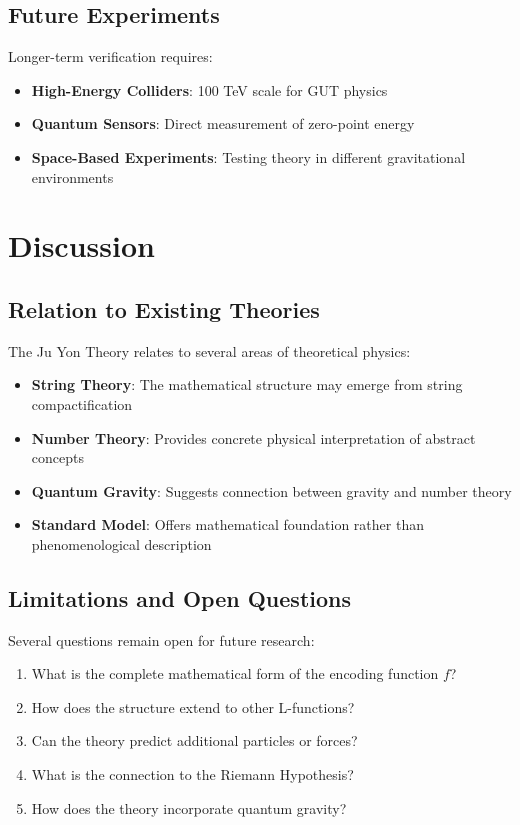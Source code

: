 \documentclass[12pt, a4paper]{article}
\begin{document}
\subsection{Future Experiments}

Longer-term verification requires:

\begin{itemize}
\item \textbf{High-Energy Colliders}: 100 TeV scale for GUT physics
\item \textbf{Quantum Sensors}: Direct measurement of zero-point energy
\item \textbf{Space-Based Experiments}: Testing theory in different gravitational environments
\end{itemize}

\section{Discussion}

\subsection{Relation to Existing Theories}

The Ju Yon Theory relates to several areas of theoretical physics:

\begin{itemize}
\item \textbf{String Theory}: The mathematical structure may emerge from string compactification
\item \textbf{Number Theory}: Provides concrete physical interpretation of abstract concepts
\item \textbf{Quantum Gravity}: Suggests connection between gravity and number theory
\item \textbf{Standard Model}: Offers mathematical foundation rather than phenomenological description
\end{itemize}

\subsection{Limitations and Open Questions}

Several questions remain open for future research:

\begin{enumerate}
\item What is the complete mathematical form of the encoding function $f$?
\item How does the structure extend to other L-functions?
\item Can the theory predict additional particles or forces?
\item What is the connection to the Riemann Hypothesis?
\item How does the theory incorporate quantum gravity?
\end{enumerate}
\end{document}
